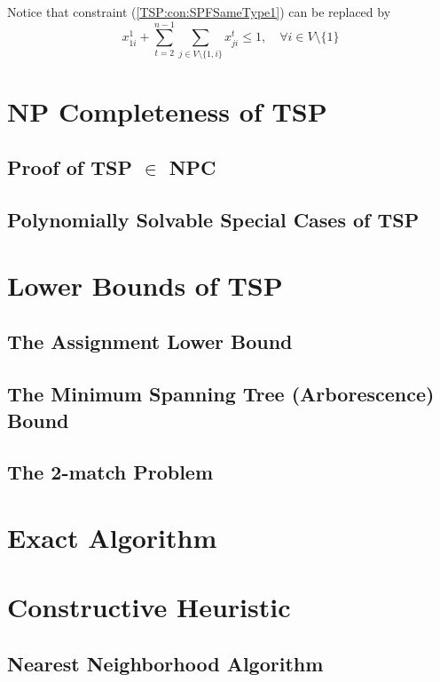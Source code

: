 					Notice that constraint (\ref{TSP:con:SPFSameType1}) can be replaced by
					\begin{equation}
						x_{1i}^1 + \sum_{t = 2}^{n - 1}\sum_{j \in V \setminus \{1, i\}} x_{ji}^t \le 1, \quad \forall i \in V \setminus \{1\} \label{TSP:con:SPFSameType2}
					\end{equation}

			\section{NP Completeness of TSP}
				\subsection{Proof of TSP $\in$ NPC}

				\subsection{Polynomially Solvable Special Cases of TSP}

			\section{Lower Bounds of TSP}
				\subsection{The Assignment Lower Bound}

				\subsection{The Minimum Spanning Tree (Arborescence) Bound}

				\subsection{The 2-match Problem}

			\section{Exact Algorithm}

			\section{Constructive Heuristic}
				\subsection{Nearest Neighborhood Algorithm}

